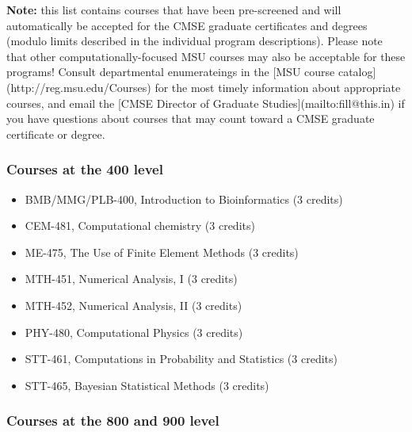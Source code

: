 \textbf{Note:} this list contains courses that have been pre-screened and will automatically be accepted for the CMSE graduate certificates and degrees (modulo limits described in the individual program descriptions).  Please note that other computationally-focused MSU courses may also be acceptable for these programs!  Consult departmental enumerateings in the [MSU course catalog](http://reg.msu.edu/Courses) for the most timely information about appropriate courses, and email the [CMSE Director of Graduate Studies](mailto:fill@this.in) if you have questions about courses that may count toward a CMSE graduate certificate or degree.

\subsubsection{Courses at the 400 level}

\begin{itemize}
\item BMB/MMG/PLB-400, Introduction to Bioinformatics (3 credits)  
\item CEM-481, Computational chemistry (3 credits)  
\item ME-475, The Use of Finite Element Methods (3 credits)  
\item MTH-451, Numerical Analysis, I (3 credits)  
\item MTH-452, Numerical Analysis, II (3 credits)  
\item PHY-480, Computational Physics (3 credits)  
\item STT-461, Computations in Probability and Statistics (3 credits)  
\item STT-465, Bayesian Statistical Methods (3 credits)  
\end{itemize}

\subsubsection{Courses at the 800 and 900 level}

